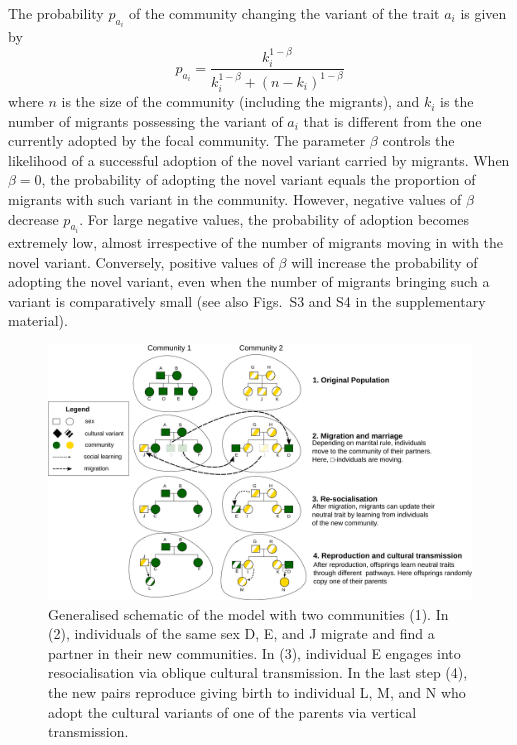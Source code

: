 \documentclass[9pt,twocolumn,twoside,lineno]{pnas-new}
\begin{document}
The probability $p_{a_i}$ of the community changing the variant of the trait $a_i$ is given by
\begin{equation}\label{eq:adoption}
p_{a_i} = \frac{k_i^{1-\beta}}{k_i^{1-\beta} + (n - k_i)^{1-\beta}}
\end{equation}
where $n$ is the size of the community (including the migrants), and $k_i$ is the number of migrants possessing the variant of $a_i$ that is different from the one currently adopted by the focal community. 
The parameter $\beta$ controls the likelihood of a successful adoption of the novel variant carried by migrants. 
When $\beta=0$, the probability of adopting the novel variant equals the proportion of migrants with such variant in the community. 
However, negative values of $\beta$ decrease $p_{a_i}$.
For large negative values, the probability of adoption becomes extremely low, almost irrespective of the number of migrants moving in with the novel variant.
Conversely, positive values of $\beta$ will increase the probability of adopting the novel variant, even when the number of migrants bringing such a variant is comparatively small (see also Figs.~S3 and S4 in the supplementary material). 

\begin{figure}[htb]
\includegraphics[width=17.0cm]{Figs/Figure1.png}
\caption{Generalised schematic of the model with two communities (1). In (2), individuals of the same sex D, E, and J migrate and find a partner in their new communities. In (3), individual E engages into resocialisation via oblique cultural transmission. In the last step (4), the new pairs reproduce giving birth to individual L, M, and N who adopt the cultural variants of one of the parents via vertical transmission.} 
\label{fig:diagram}       
\end{figure}
\end{document}
